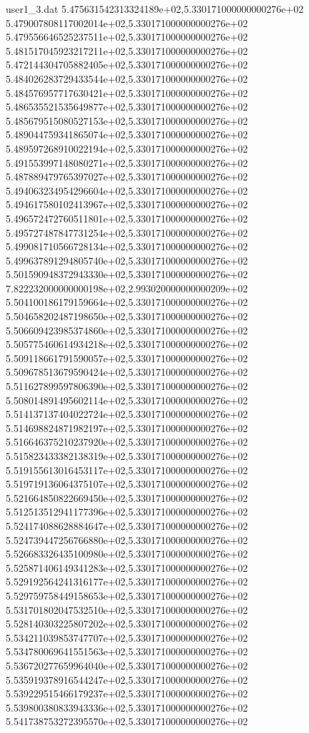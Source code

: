 \begin{filecontents}{user1_3.dat}
5.475631542313324189e+02,5.330171000000000276e+02
5.479007808117002014e+02,5.330171000000000276e+02
5.479556646525237511e+02,5.330171000000000276e+02
5.481517045923217211e+02,5.330171000000000276e+02
5.472144304705882405e+02,5.330171000000000276e+02
5.484026283729433544e+02,5.330171000000000276e+02
5.484576957717630421e+02,5.330171000000000276e+02
5.486535521535649877e+02,5.330171000000000276e+02
5.485679515080527153e+02,5.330171000000000276e+02
5.489044759341865074e+02,5.330171000000000276e+02
5.489597268910022194e+02,5.330171000000000276e+02
5.491553997148080271e+02,5.330171000000000276e+02
5.487889479765397027e+02,5.330171000000000276e+02
5.494063234954296604e+02,5.330171000000000276e+02
5.494617580102413967e+02,5.330171000000000276e+02
5.496572472760511801e+02,5.330171000000000276e+02
5.495727487847731254e+02,5.330171000000000276e+02
5.499081710566728134e+02,5.330171000000000276e+02
5.499637891294805740e+02,5.330171000000000276e+02
5.501590948372943330e+02,5.330171000000000276e+02
7.822232000000000198e+02,2.993020000000000209e+02
5.504100186179159664e+02,5.330171000000000276e+02
5.504658202487198650e+02,5.330171000000000276e+02
5.506609423985374860e+02,5.330171000000000276e+02
5.505775460614934218e+02,5.330171000000000276e+02
5.509118661791590057e+02,5.330171000000000276e+02
5.509678513679590424e+02,5.330171000000000276e+02
5.511627899597806390e+02,5.330171000000000276e+02
5.508014891495602114e+02,5.330171000000000276e+02
5.514137137404022724e+02,5.330171000000000276e+02
5.514698824871982197e+02,5.330171000000000276e+02
5.516646375210237920e+02,5.330171000000000276e+02
5.515823433382138319e+02,5.330171000000000276e+02
5.519155613016453117e+02,5.330171000000000276e+02
5.519719136064375107e+02,5.330171000000000276e+02
5.521664850822669450e+02,5.330171000000000276e+02
5.512513512941177396e+02,5.330171000000000276e+02
5.524174088628884647e+02,5.330171000000000276e+02
5.524739447256766880e+02,5.330171000000000276e+02
5.526683326435100980e+02,5.330171000000000276e+02
5.525871406149341283e+02,5.330171000000000276e+02
5.529192564241316177e+02,5.330171000000000276e+02
5.529759758449158653e+02,5.330171000000000276e+02
5.531701802047532510e+02,5.330171000000000276e+02
5.528140303225807202e+02,5.330171000000000276e+02
5.534211039853747707e+02,5.330171000000000276e+02
5.534780069641551563e+02,5.330171000000000276e+02
5.536720277659964040e+02,5.330171000000000276e+02
5.535919378916544247e+02,5.330171000000000276e+02
5.539229515466179237e+02,5.330171000000000276e+02
5.539800380833943336e+02,5.330171000000000276e+02
5.541738753272395570e+02,5.330171000000000276e+02

\end{filecontents}
